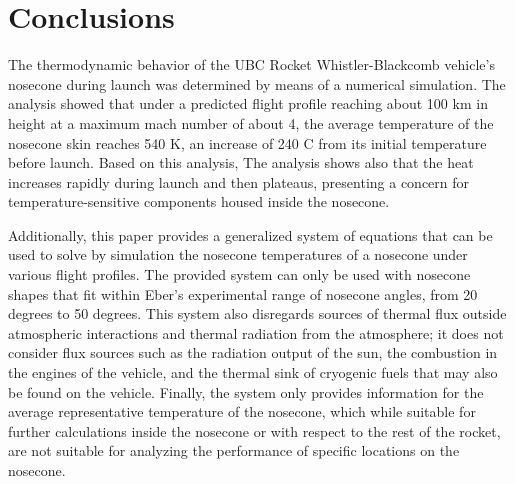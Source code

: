 \documentclass[twocolumn]{article}
\begin{document}
    \section{Conclusions}
        The thermodynamic behavior of the UBC Rocket Whistler-Blackcomb vehicle's 
        nosecone during launch was determined by means of a numerical simulation.
        The analysis showed that under a predicted flight
        profile reaching about 100 km in height at a maximum mach number of about
        4, the average temperature of the nosecone skin reaches 540 K, an increase
        of 240 C from its initial temperature before launch. Based on this analysis,
        The analysis shows also that the heat increases rapidly during launch and then
        plateaus, presenting a concern for temperature-sensitive components housed 
        inside the nosecone.

        Additionally, this paper provides a generalized system of equations that
        can be used to solve by simulation the nosecone temperatures of a nosecone
        under various flight profiles. The provided system can only be used with
        nosecone shapes that fit within Eber's experimental range of nosecone angles, 
        from 20 degrees to 50 degrees. This system also disregards 
        sources of thermal flux outside atmospheric interactions and thermal
        radiation from the atmosphere; it does not consider flux sources such as 
        the radiation output of the sun, the combustion in the engines of the 
        vehicle, and the thermal sink of cryogenic fuels that may also be found 
        on the vehicle. Finally, the system only provides information for the 
        average representative temperature of the nosecone, which while suitable 
        for further calculations inside the nosecone or with respect to the rest
        of the rocket, are not suitable for analyzing the performance of specific 
        locations on the nosecone.
\end{document}
